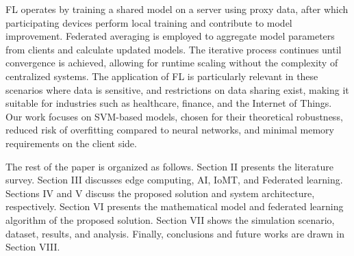 \documentclass[conference]{IEEEtran}
\begin{document}
FL\cite{3} operates by training a shared model on a server using proxy data, after which participating devices perform local training and contribute to model improvement. Federated averaging is employed to aggregate model parameters from clients and calculate updated models. The iterative process continues until convergence is achieved, allowing for runtime scaling without the complexity of centralized systems. The application of FL\cite{4} is particularly relevant in these scenarios where data is sensitive, and restrictions on data sharing exist, making it suitable for industries such as healthcare, finance, and the Internet of Things. Our work focuses on SVM-based models, chosen for their theoretical robustness, reduced risk\cite{5} of overfitting compared to neural networks, and minimal memory requirements on the client side.

The rest of the paper is organized as follows. Section II presents the literature survey. Section III discusses edge computing, AI, IoMT, and Federated learning.  Sections IV and V discuss the proposed solution and system architecture, respectively. Section VI presents the mathematical model and federated learning algorithm of the proposed solution. Section VII shows the simulation scenario, dataset, results, and analysis. Finally, conclusions and future works are drawn in Section VIII.

\end{document}
